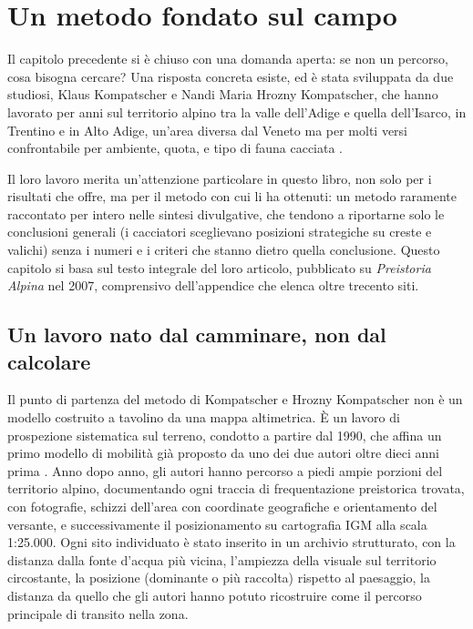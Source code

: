 \chapter{Un metodo fondato sul campo}
\label{cap:metodo_kompatscher}

Il capitolo precedente si è chiuso con una domanda aperta: se non un percorso, cosa bisogna cercare? Una risposta concreta esiste, ed è stata sviluppata da due studiosi, Klaus Kompatscher e Nandi Maria Hrozny Kompatscher, che hanno lavorato per anni sul territorio alpino tra la valle dell'Adige e quella dell'Isarco, in Trentino e in Alto Adige, un'area diversa dal Veneto ma per molti versi confrontabile per ambiente, quota, e tipo di fauna cacciata \citep{kompatscher2007}.

Il loro lavoro merita un'attenzione particolare in questo libro, non solo per i risultati che offre, ma per il metodo con cui li ha ottenuti: un metodo raramente raccontato per intero nelle sintesi divulgative, che tendono a riportarne solo le conclusioni generali (i cacciatori sceglievano posizioni strategiche su creste e valichi) senza i numeri e i criteri che stanno dietro quella conclusione. Questo capitolo si basa sul testo integrale del loro articolo, pubblicato su \textit{Preistoria Alpina} nel 2007, comprensivo dell'appendice che elenca oltre trecento siti.

\section{Un lavoro nato dal camminare, non dal calcolare}

Il punto di partenza del metodo di Kompatscher e Hrozny Kompatscher non è un modello costruito a tavolino da una mappa altimetrica. È un lavoro di prospezione sistematica sul terreno, condotto a partire dal 1990, che affina un primo modello di mobilità già proposto da uno dei due autori oltre dieci anni prima \citep{kompatscher2007}. Anno dopo anno, gli autori hanno percorso a piedi ampie porzioni del territorio alpino, documentando ogni traccia di frequentazione preistorica trovata, con fotografie, schizzi dell'area con coordinate geografiche e orientamento del versante, e successivamente il posizionamento su cartografia IGM alla scala 1:25.000. Ogni sito individuato è stato inserito in un archivio strutturato, con la distanza dalla fonte d'acqua più vicina, l'ampiezza della visuale sul territorio circostante, la posizione (dominante o più raccolta) rispetto al paesaggio, la distanza da quello che gli autori hanno potuto ricostruire come il percorso principale di transito nella zona.

